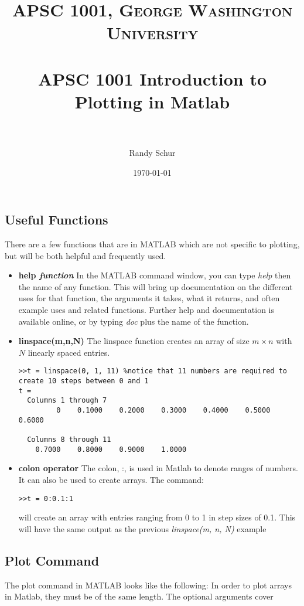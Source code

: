 \documentclass[paper=a4, fontsize=11pt]{scrartcl} %
\title{	
\normalfont \normalsize 
\textsc{APSC 1001, George Washington University} \\ [25pt] %
\horrule{0.5pt} \\[0.4cm] %
\huge APSC 1001 Introduction to Plotting in Matlab \\ %
\horrule{2pt} \\[0.5cm] %
}
\author{\normalsize Randy Schur } %
\date{\normalsize \today } %
\numberwithin{equation}{section} %
\numberwithin{figure}{section} %
\numberwithin{table}{section} %
\begin{document}
\maketitle %

\subsection{Useful Functions}
There are a few functions that are in MATLAB which are not specific to plotting, but will be both helpful and frequently used.

\begin{itemize}
\item \textbf{help \textit{function}} In the MATLAB command window, you can type \textit{help} then the name of any function. This will bring up documentation on the different uses for that function, the arguments it takes, what it returns, and often example uses and related functions. Further help and documentation is available online, or by typing \textit{doc} plus the name of the function. 
\item \textbf{linspace(m,n,N)} The linspace function creates an array of size $m \times n$ with $N$ linearly spaced entries.
\begin{verbatim}
>>t = linspace(0, 1, 11) %notice that 11 numbers are required to create 10 steps between 0 and 1 
t =
  Columns 1 through 7
         0    0.1000    0.2000    0.3000    0.4000    0.5000    0.6000

  Columns 8 through 11
    0.7000    0.8000    0.9000    1.0000
\end{verbatim} 
 
\item \textbf{colon operator}	The colon, :, is used in Matlab to denote ranges of numbers. It can also be used to create arrays. The command:
\begin{verbatim}
>>t = 0:0.1:1	
\end{verbatim} 
will create an array with entries ranging from 0 to 1 in step sizes of 0.1. 
This will have the same output as the previous \textit{linspace(m, n, N)} example
\end{itemize}

\subsection{Plot Command}
The plot command in MATLAB looks like the following: 
In order to plot arrays in Matlab, they must be of the same length.
The optional arguments cover 
\end{document}
